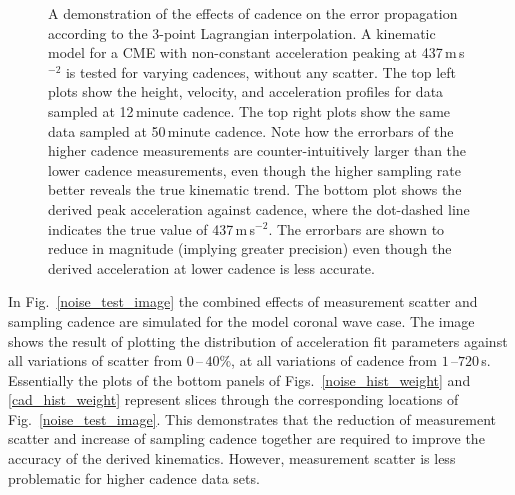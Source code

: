 \documentclass[structabstract]{aa}
\begin{document}
\begin{figure}[!ht]
\caption{A demonstration of the effects of cadence on the error propagation according to the 3-point Lagrangian interpolation. A kinematic model for a CME with non-constant acceleration peaking at 437\,m\,s$^{-2}$ is tested for varying cadences, without any scatter. The top left plots show the height, velocity, and acceleration profiles for data sampled at 12\,minute cadence. The top right plots show the same data sampled at 50\,minute cadence. Note how the errorbars of the higher cadence measurements are counter-intuitively larger than the lower cadence measurements, even though the higher sampling rate better reveals the true kinematic trend. The bottom plot shows the derived peak acceleration against cadence, where the dot-dashed line indicates the true value of 437\,m\,s$^{-2}$. The errorbars are shown to reduce in magnitude (implying greater precision) even though the derived acceleration at lower cadence is less accurate.}
\label{fig_cadence_hva}
\end{figure}

In Fig.~\ref{noise_test_image} the combined effects of measurement scatter and sampling cadence are simulated for the model coronal wave case. The image shows the result of plotting the distribution of acceleration fit parameters against all variations of scatter from $0$\,--\,$40\%$, at all variations of cadence from $1$\,--$720$\,s. Essentially the plots of the bottom panels of Figs.~\ref{noise_hist_weight} and \ref{cad_hist_weight} represent slices through the corresponding locations of Fig.~\ref{noise_test_image}. This demonstrates that the reduction of measurement scatter and increase of sampling cadence together are required to improve the accuracy of the derived kinematics. However, measurement scatter is less problematic for higher cadence data sets.
\end{document}
